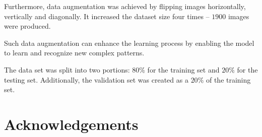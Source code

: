 \documentclass[preprint,9pt]{elsarticle}
\begin{document}
Furthermore, data augmentation was achieved by flipping images horizontally, vertically and diagonally. 
It increased the dataset size four times -- \(1900\) images were produced.
	
Such data augmentation can enhance the learning process by enabling the model to learn and recognize new complex patterns.
	
The data set was split into two portions:  \(80\%\) for the training set and \(20\%\) for the testing set.
Additionally, the validation set was created as a \(20\%\) of the training set.




\section*{Acknowledgements}
\section*{ }


\end{document}
